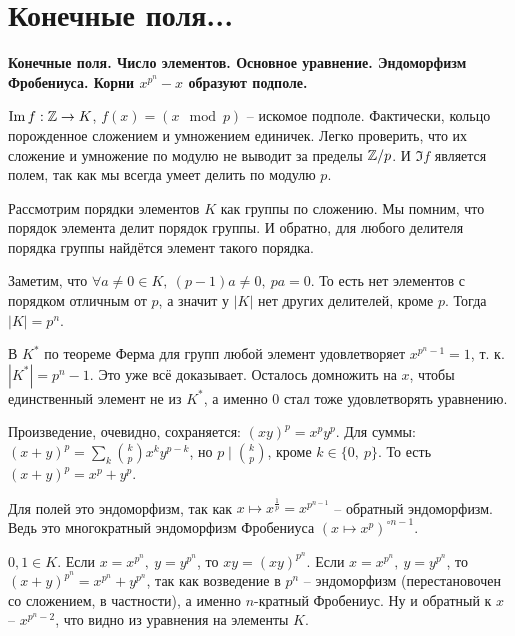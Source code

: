 \section{
	Конечные поля... %
}

\textbf{Конечные поля. Число элементов. Основное уравнение. Эндоморфизм Фробениуса. Корни $x^{p^n} - x$ образуют подполе.}


	\proof
	$\operatorname{Im} f : \mathbb{Z} \to K$, $f(x) = (x \mod p)$ -- искомое подполе. Фактически, кольцо порожденное сложением и умножением единичек. Легко проверить, что их сложение и умножение по модулю не выводит за пределы $\mathbb{Z}/p$. И $\Im f$ является полем, так как мы всегда умеет делить по модулю $p$.
	\endproof

\elm


	\proof
	Рассмотрим порядки элементов $K$ как группы по сложению. Мы помним, что порядок элемента делит порядок группы. И обратно, для любого делителя порядка группы найдётся элемент такого порядка.

	Заметим, что $\forall a \neq 0 \in K,\ (p - 1)a \neq 0,\ pa = 0$. То есть нет элементов с порядком отличным от $p$, а значит у $|K|$ нет других делителей, кроме $p$. Тогда $|K| = p^n$.
	\endproof

\elm

	
	\proof
	В $K^*$ по теореме Ферма для групп любой элемент удовлетворяет $x^{p^{n} - 1} = 1$, т. к. $|K^*| = p^n - 1$. Это уже всё доказывает. Осталось домножить на $x$, чтобы единственный элемент не из $K^*$, а именно $0$ стал тоже удовлетворять уравнению.
	\endproof

\elm


	\proof
	Произведение, очевидно, сохраняется: $(xy)^p = x^py^p$. Для суммы: $(x + y) ^ p = \sum\limits_k \binom{k}{p} x^ky^{p - k}$, но $p \mid \binom{k}{p}$, кроме $k \in \{0,\ p\}$. То есть $(x + y)^p = x^p + y^p$.

	Для полей это эндоморфизм, так как $x \mapsto x^{\frac{1}{p}} = x^{p^{n - 1}}$ -- обратный эндоморфизм. Ведь это многократный эндоморфизм Фробениуса $(x \mapsto x^p)^{\circ n - 1}$.
	\endproof

\elm

	
	\proof
	$0, 1 \in K$. Если $x = x^{p^n},\ y = y^{p^n}$, то $xy = (xy)^{p^n}$. Если $x = x^{p^n},\ y = y^{p^n}$, то $(x + y)^{p^n} = x^{p^n} + y^{p^n}$, так как возведение в $p^n$ -- эндоморфизм (перестановочен со сложением, в частности), а именно $n$-кратный Фробениус. Ну и обратный к $x$ -- $x^{p^n - 2}$, что видно из уравнения на элементы $K$.
	\endproof


\elm
